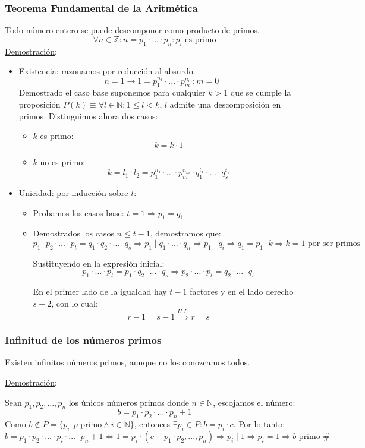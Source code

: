 \documentclass[10pt,a4paper,openright]{book}
\begin{document}
\subsubsection*{Teorema Fundamental de la Aritmética}
Todo número entero se puede descomponer como producto de primos.
$$\forall n\in \mathbb Z: n=p_1\cdot ...\cdot p_n: p_i\mbox{ es primo}$$
\underline{Demostración}:
\begin{itemize}
\item Existencia: razonamos por reducción al absurdo.
$$n=1\rightarrow 1=p_1^{n_1}\cdot ... \cdot p_m^{n_m}: m=0$$
Demostrado el caso base suponemos para cualquier $k>1$ que se cumple la proposición $P(k)\equiv \forall l\in \mathbb N: 1\leq l<k$, $l$ admite una descomposición en primos. Distinguimos ahora dos casos:
	\begin{itemize}
	\item $k$ es primo:
	$$k=k\cdot 1$$
	
	\item $k$ no es primo:
	$$k=l_1\cdot l_2=p_1^{n_1}\cdot ... \cdot p_m^{n_m}\cdot q_1^{t_1}\cdot ... \cdot q_s^{t_s}$$
	\end{itemize}
	
\item Unicidad: por inducción sobre $t$:
\begin{itemize}
	\item Probamos los casos base: $t=1\Rightarrow p_1=q_1$

	\item Demostrados los casos $n\leq t-1$, demostramos que:
$$p_1\cdot p_2 \cdot ... \cdot p_t=q_1\cdot q_2 \cdot ... \cdot q_s \Rightarrow p_1\mid q_1\cdot ... \cdot q_n\Rightarrow p_1\mid q_i \Rightarrow q_1=p_1\cdot k \Rightarrow k=1\mbox{ por ser primos}$$
	
	Sustituyendo en la expresión inicial:
$$p_1\cdot ... \cdot p_t=p_1\cdot q_2\cdot ... \cdot q_s\Rightarrow p_2\cdot ... \cdot p_t=q_2\cdot ... \cdot q_s$$

	En el primer lado de la igualdad hay $t-1$ factores y en el lado derecho $s-2$, con lo cual:
$$r-1=s-1\stackrel{H.I:}{\Rightarrow }r=s$$
\end{itemize}
\end{itemize}

\subsubsection*{Infinitud de los números primos}
Existen infinitos números primos, aunque no los conozcamos todos.\par
\underline{Demostración}:\par
Sean $p_1,p_2,..., p_n$ los únicos números primos donde $n\in \mathbb N$, escojamos el número:
$$b=p_1\cdot p_2\cdot ... \cdot p_n+1$$
Como $b\notin P=\{p_i: p \mbox{ primo}\wedge i\in \mathbb N\}$, entonces $\exists p_i\in P: b=p_i\cdot c$. Por lo tanto:
$$b=p_1\cdot p_2\cdot ...\cdot p_i \cdot ... \cdot p_n+1\Leftrightarrow 1=p_i\cdot (c- p_1\cdot p_2,...,p_n)\Rightarrow p_i\mid 1\Rightarrow p_i=1\Rightarrow b \mbox{ primo \#}$$
\end{document}
